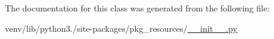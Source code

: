 The documentation for this class was generated from the following file\+:\begin{DoxyCompactItemize}
\item 
venv/lib/python3./site-\/packages/pkg\+\_\+resources/\hyperlink{venv_2lib_2python3_89_2site-packages_2pkg__resources_2____init_____8py}{\+\_\+\+\_\+init\+\_\+\+\_\+.\+py}\end{DoxyCompactItemize}
